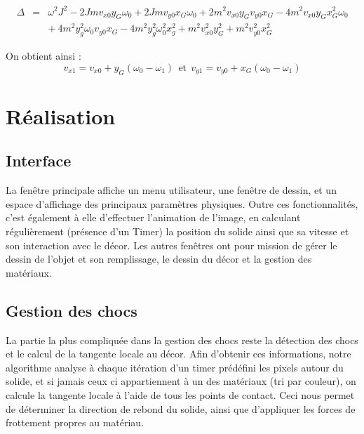 \begin{eqnarray*}
	\Delta & = & \omega^2 J^2 -2Jmv_{x0}y_G\omega_0 + 2Jmv_{y0}x_G \omega_0  + 2m^2v_{x0}y_Gv_{y0}x_G - 4m^2v_{x0}y_Gx^2_G\omega_0 \\
		& & +\ 4m^2y^2_g\omega_0 v_{y0} x_G- 4m^2y^2_g\omega^2_0x^2_g + m^2v^2_{x0}y^2_G + m^2v^2_{y0}x^2_G
\end{eqnarray*}

On obtient ainsi :
\begin{equation}
v_{x1}=v_{x0} +y_G(\omega_0 - \omega_1) \: \ \text{et} \ \:  v_{y1}=v_{y0} +x_G(\omega_0 - \omega_1)
\end{equation} 

\newpage

\section{Réalisation}
\subsection{Interface}
La fenêtre principale affiche un menu utilisateur, une fenêtre de dessin,
et un espace d'affichage des principaux paramètres physiques.
Outre ces fonctionnalités, c'est également à elle d'effectuer l'animation
de l'image, en calculant régulièrement (présence d'un Timer) la position
du solide ainsi que sa vitesse et son interaction avec le décor.
Les autres fenêtres ont pour mission de gérer le dessin de l'objet et son remplissage,
le dessin du décor et la gestion des matériaux.


\subsection{Gestion des chocs}
La partie la plus compliquée dans la gestion des chocs reste la détection des chocs
et le calcul de la tangente locale au décor. Afin d'obtenir ces informations,
notre algorithme analyse à chaque itération d'un timer prédéfini
les pixels autour du solide, et si jamais ceux ci appartiennent à un des
matériaux (tri par couleur), on calcule la tangente locale à l'aide de
tous les points de contact. Ceci nous permet de déterminer la direction 
de rebond du solide, ainsi que d'appliquer les forces de frottement propres au matériau.



